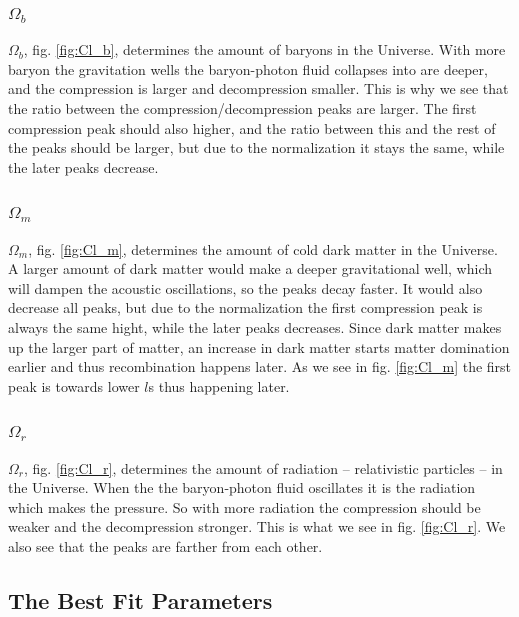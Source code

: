 \documentclass[a4paper,norsk, 10pt]{article}
\begin{document}
\subsubsection{$\Omega_b$}
$\Omega_b$, fig. \ref{fig:Cl_b}, determines the amount of baryons in the Universe. With more baryon the gravitation wells the baryon-photon fluid collapses into are deeper, and the compression is larger and decompression smaller. This is why we see that the ratio between the compression/decompression peaks are larger. The first compression peak should also higher, and the ratio between this and the rest of the peaks should be larger, but due to the normalization it stays the same, while the later peaks decrease. 


\subsubsection{$\Omega_m$}
$\Omega_m$, fig. \ref{fig:Cl_m}, determines the amount of cold dark matter in the Universe. A larger amount of dark matter would make a deeper gravitational well, which will dampen the acoustic oscillations, so the peaks decay faster. It would also decrease all peaks, but due to the normalization the first compression peak is always the same hight, while the later peaks decreases. Since dark matter makes up the larger part of matter, an increase in dark matter starts matter domination earlier and thus recombination happens later. As we see in fig. \ref{fig:Cl_m} the first peak is towards lower $l$s thus happening	 later.

\subsubsection{$\Omega_r$}
$\Omega_r$, fig. \ref{fig:Cl_r}, determines the amount of radiation -- relativistic particles -- in the Universe. When the the baryon-photon fluid oscillates it is the radiation which makes the pressure. So with more radiation the compression should be weaker and the decompression stronger. This is what we see in fig. \ref{fig:Cl_r}. We also see that the peaks are farther from each other.

\subsection{The Best Fit Parameters}
\end{document}
